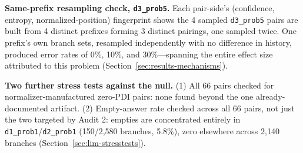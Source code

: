 \documentclass{article}
\begin{document}
\textbf{Same-prefix resampling check, \texttt{d3\_prob5}.} Each pair-side's (confidence, entropy, normalized-position) fingerprint shows the 4 sampled \texttt{d3\_prob5} pairs are built from 4 distinct prefixes forming 3 distinct pairings, one sampled twice. One prefix's own branch sets, resampled independently with no difference in history, produced error rates of 0\%, 10\%, and 30\%---spanning the entire effect size attributed to this problem (Section~\ref{sec:results-mechanisms}).

\textbf{Two further stress tests against the null.} (1) All 66 pairs checked for normalizer-manufactured zero-PDI pairs: none found beyond the one already-documented artifact. (2) Empty-answer rate checked across all 66 pairs, not just the two targeted by Audit 2: empties are concentrated entirely in \texttt{d1\_prob1}/\texttt{d2\_prob1} (150/2,580 branches, 5.8\%), zero elsewhere across 2,140 branches (Section~\ref{sec:lim-stresstests}).



\end{document}
